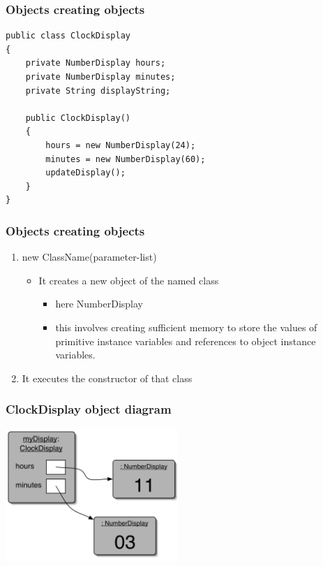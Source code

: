 \begin{frame}[fragile]
\frametitle{Objects creating objects}
\codelist
\begin{lstlisting}
public class ClockDisplay
{
    private NumberDisplay hours;
    private NumberDisplay minutes;
    private String displayString; 
    
    public ClockDisplay()‏
    {
        hours = new NumberDisplay(24);
        minutes = new NumberDisplay(60);
        updateDisplay();
    }
}
\end{lstlisting}
\end{frame}

\begin{frame}
\frametitle{Objects creating objects}
\begin{enumerate}
\item new ClassName(parameter-list)‏
\begin{itemize}
\item It creates a new object of the named class
\begin{itemize}
\item here NumberDisplay
\item this involves creating sufficient memory to store the values of primitive instance variables and references to object instance variables.
\end{itemize}
\end{itemize}
\item It executes the constructor of that class
\end{enumerate}
\end{frame}

\begin{frame} 
\frametitle{ClockDisplay object diagram}
\begin{center}
\includegraphics[height=5cm, keepaspectratio]{./figures/object}
\end{center}
\end{frame}

